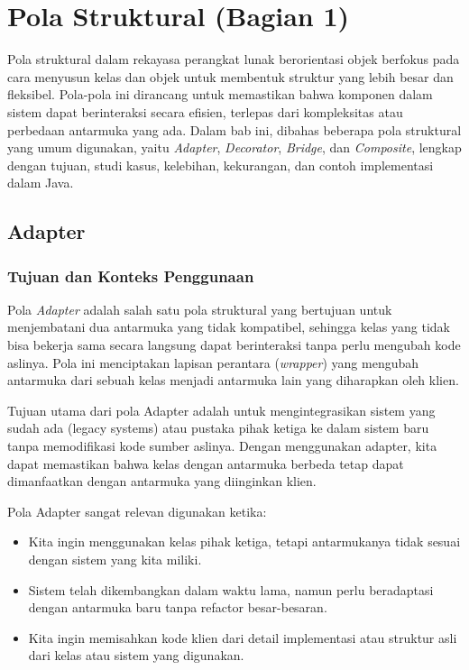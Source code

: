 \chapter{Pola Struktural (Bagian 1)}


Pola struktural dalam rekayasa perangkat lunak berorientasi objek berfokus pada cara menyusun kelas dan objek untuk membentuk struktur yang lebih besar dan fleksibel. Pola-pola ini dirancang untuk memastikan bahwa komponen dalam sistem dapat berinteraksi secara efisien, terlepas dari kompleksitas atau perbedaan antarmuka yang ada. Dalam bab ini, dibahas beberapa pola struktural yang umum digunakan, yaitu \textit{Adapter}, \textit{Decorator}, \textit{Bridge}, dan \textit{Composite}, lengkap dengan tujuan, studi kasus, kelebihan, kekurangan, dan contoh implementasi dalam Java.


\section{Adapter}

\subsection{Tujuan dan Konteks Penggunaan}

Pola \textit{Adapter} adalah salah satu pola struktural yang bertujuan untuk menjembatani dua antarmuka yang tidak kompatibel, sehingga kelas yang tidak bisa bekerja sama secara langsung dapat berinteraksi tanpa perlu mengubah kode aslinya. Pola ini menciptakan lapisan perantara (\textit{wrapper}) yang mengubah antarmuka dari sebuah kelas menjadi antarmuka lain yang diharapkan oleh klien.

Tujuan utama dari pola Adapter adalah untuk mengintegrasikan sistem yang sudah ada (legacy systems) atau pustaka pihak ketiga ke dalam sistem baru tanpa memodifikasi kode sumber aslinya. Dengan menggunakan adapter, kita dapat memastikan bahwa kelas dengan antarmuka berbeda tetap dapat dimanfaatkan dengan antarmuka yang diinginkan klien.

Pola Adapter sangat relevan digunakan ketika:
\begin{itemize}
	\item Kita ingin menggunakan kelas pihak ketiga, tetapi antarmukanya tidak sesuai dengan sistem yang kita miliki.
	\item Sistem telah dikembangkan dalam waktu lama, namun perlu beradaptasi dengan antarmuka baru tanpa refactor besar-besaran.
	\item Kita ingin memisahkan kode klien dari detail implementasi atau struktur asli dari kelas atau sistem yang digunakan.
\end{itemize}

